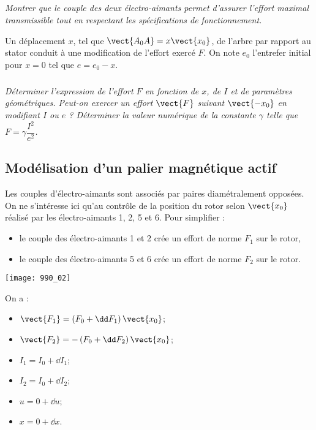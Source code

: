 \subparagraph{}
\textit{Montrer que le couple des deux électro-aimants permet d'assurer l'effort
maximal transmissible tout en respectant les spécifications de fonctionnement.}
\ifprof
\begin{corrige}
\end{corrige}
\else
\fi

Un déplacement $x$, tel que $\vect{A_0A}=x\vect{x_0}$, de l'arbre par rapport au stator conduit
à une modification de l'effort exercé $F$. On note $e_0$ l'entrefer initial pour $x=0$ tel que $e=e_0-x$.

\subparagraph{}
\textit{Déterminer l'expression de l'effort $F$ en fonction de $x$, de $I$ et de paramètres
géométriques. Peut-on exercer un effort $\vect{F}$ suivant $\vect{-x_0}$ en modifiant $I$ ou
$e$ ? Déterminer la valeur numérique de la constante $\gamma$ telle que $F=\gamma \dfrac{I^2}{e^2}$.}
\ifprof
\begin{corrige}
\end{corrige}
\else
\fi


\subsection*{Modélisation d'un palier magnétique actif}
Les couples d'électro-aimants sont associés par paires diamétralement opposées.
On ne s'intéresse ici qu'au contrôle de la position du rotor selon $\vect{x_0}$ réalisé
par les électro-aimants 1, 2, 5 et 6. Pour simplifier :
\begin{itemize}
\item le couple des électro-aimants 1 et 2 crée un effort de norme $F_1$ sur le rotor,
\item le couple des électro-aimants 5 et 6 crée un effort de norme $F_2$ sur le rotor.
\end{itemize}


\begin{center}
\texttt{[image: 990\_02]}
\end{center}

On a :
\begin{itemize}
\item $\vect{F_1}=\left(F_0+\dd F_1\right) \vect{x_0}$;
\item $\vect{F_2}=-\left(F_0+\dd F_2\right) \vect{x_0}$;
\item $I_1 = I_0 +\dd I_1$;
\item $I_2 = I_0 +\dd I_2$;
\item $u = 0 +\dd u$;
\item $x = 0 +\dd x$.
\end{itemize}

